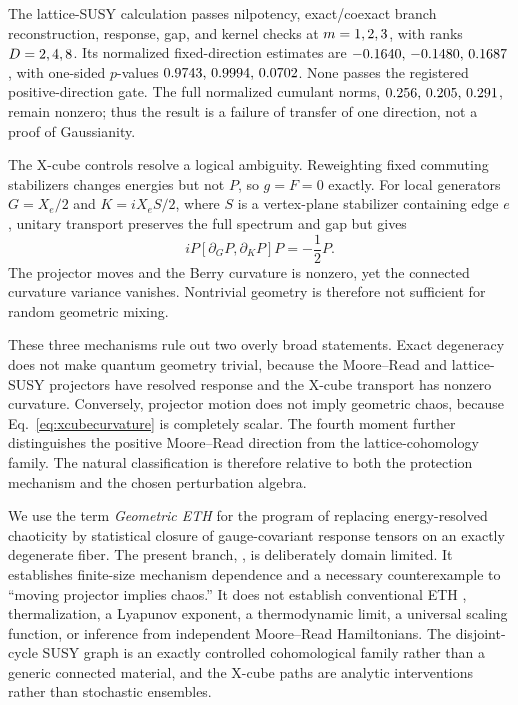 \documentclass[aps,prb,reprint,superscriptaddress,longbibliography,floatfix]{revtex4-2}
\begin{document}
The lattice-SUSY calculation passes nilpotency, exact/coexact branch reconstruction, response, gap, and kernel checks at \(m=1,2,3\), with ranks \(D=2,4,8\). Its normalized fixed-direction estimates are \(-0.1640,\,-0.1480,\,0.1687\), with one-sided \(p\)-values \(0.9743,\,0.9994,\,0.0702\). None passes the registered positive-direction gate. The full normalized cumulant norms, \(0.256,\,0.205,\,0.291\), remain nonzero; thus the result is a failure of transfer of one direction, not a proof of Gaussianity.

The X-cube controls resolve a logical ambiguity. Reweighting fixed commuting stabilizers changes energies but not \(P\), so \(g=F=0\) exactly. For local generators \(G=X_e/2\) and \(K=iX_eS/2\), where \(S\) is a vertex-plane stabilizer containing edge \(e\), unitary transport preserves the full spectrum and gap but gives
\begin{equation}
iP[\partial_G P,\partial_K P]P=-\frac{1}{2}P.
\label{eq:xcubecurvature}
\end{equation}
The projector moves and the Berry curvature is nonzero, yet the connected curvature variance vanishes. Nontrivial geometry is therefore not sufficient for random geometric mixing.

These three mechanisms rule out two overly broad statements. Exact degeneracy does not make quantum geometry trivial, because the Moore--Read and lattice-SUSY projectors have resolved response and the X-cube transport has nonzero curvature. Conversely, projector motion does not imply geometric chaos, because Eq.~\eqref{eq:xcubecurvature} is completely scalar. The fourth moment further distinguishes the positive Moore--Read direction from the lattice-cohomology family. The natural classification is therefore relative to both the protection mechanism and the chosen perturbation algebra.

We use the term \emph{Geometric ETH} for the program of replacing energy-resolved chaoticity by statistical closure of gauge-covariant response tensors on an exactly degenerate fiber. The present branch, \texttt{\CrossMechanismBranch}, is deliberately domain limited. It establishes finite-size mechanism dependence and a necessary counterexample to ``moving projector implies chaos.'' It does not establish conventional ETH \cite{srednicki1994}, thermalization, a Lyapunov exponent, a thermodynamic limit, a universal scaling function, or inference from independent Moore--Read Hamiltonians. The disjoint-cycle SUSY graph is an exactly controlled cohomological family rather than a generic connected material, and the X-cube paths are analytic interventions rather than stochastic ensembles.
\end{document}
